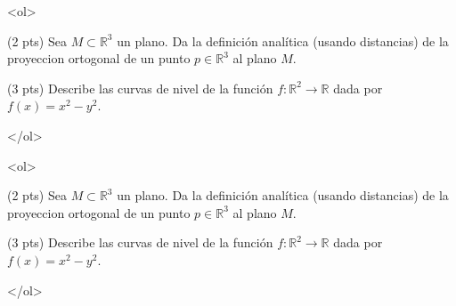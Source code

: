 \documentclass[12pt]{article}
\begin{document}
\bigskip

            
\bigskip
\bigskip
\bigskip


<ol>

\item (2 pts) Sea $M\subset \mathbb{R}^3$ un plano. Da la definición analítica (usando distancias) de la proyeccion
  ortogonal de un punto $p\in \mathbb{R}^3$ al plano $M$. 
\vspace{3cm}
  
\item (3 pts) Describe las curvas de nivel de la función $f:\mathbb{R}^2\to \mathbb{R}$ dada por $f(x)=x^2-y^2$.



  </ol>


  \vspace{3cm}

\bigskip

            
\bigskip
\bigskip
\bigskip


<ol>

\item (2 pts) Sea $M\subset \mathbb{R}^3$ un plano. Da la definición analítica (usando distancias) de la proyeccion
  ortogonal de un punto $p\in \mathbb{R}^3$ al plano $M$. 
\vspace{3cm}
  
\item (3 pts) Describe las curvas de nivel de la función $f:\mathbb{R}^2\to \mathbb{R}$ dada por $f(x)=x^2-y^2$.



  </ol>

  
  
\end{document}
